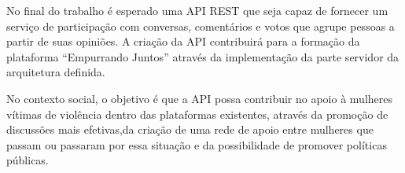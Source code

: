 No final do trabalho é esperado uma API REST que seja capaz de fornecer um serviço de participação com conversas, comentários
e votos que agrupe pessoas a partir de suas opiniões. A criação da API contribuirá para a formação da plataforma ``Empurrando Juntos'' 
através da implementação da parte servidor da arquitetura definida.

No contexto social, o objetivo é que a API possa contribuir no apoio à mulheres vítimas de violência dentro das plataformas existentes, através
da promoção de discussões mais efetivas,da criação de uma rede de apoio entre mulheres que passam ou passaram por essa situação
e da possibilidade de promover políticas públicas.








